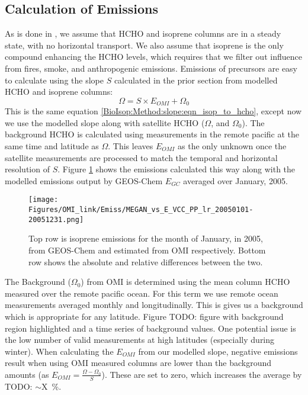     
    
    
  \subsection{Calculation of Emissions}
    \label{BioIsop:Method:calculation}
   
    As is done in \textcite{Palmer2003, Millet2006, Bauwens2016}, we assume that HCHO and isoprene columns are in a steady state, with no horizontal transport.
    We also assume that isoprene is the only compound enhancing the HCHO levels, which requires that we filter out influence from fires, smoke, and anthropogenic emissions.
    Emissions of precursors are easy to calculate using the slope $S$ calculated in the prior section from modelled HCHO and isoprene columns:
    \begin{equation*}
    \Omega = S \times E_{OMI} + \Omega_0
    \end{equation*}
    This is the same equation \ref{BioIsop:Method:slope:eqn_isop_to_hcho}, except now we use the modelled slope along with satellite HCHO ($\Omega$, and $\Omega_0$).
    The background HCHO is calculated using measurements in the remote pacific at the same time and latitude as $\Omega$.
    This leaves $E_{OMI}$ as the only unknown once the satellite measurements are processed to match the temporal and horizontal resolution of $S$.
    Figure \ref{BioIsop:Method:calculation:fig_E_isop_200501} shows the emissions calculated this way along with the modelled emissions output by GEOS-Chem $E_{GC}$ averaged over January, 2005.
    \begin{figure}
      \texttt{[image: Figures/OMI\_link/Emiss/MEGAN\_vs\_E\_VCC\_PP\_lr\_20050101-20051231.png]}
      \caption{%
        Top row is isoprene emissions for the month of January, in 2005, from GEOS-Chem and estimated from OMI respectively.
        Bottom row shows the absolute and relative differences between the two.
      }
      \label{BioIsop:Method:calculation:fig_E_isop_200501}
    \end{figure}
    
    The Background ($\Omega_0$) from OMI is determined using the mean column HCHO measured over the remote pacific ocean.
    For this term we use remote ocean measurements averaged monthly and longitudinally.
    This is gives us a background which is appropriate for any latitude.
    Figure TODO: figure with background region highlighted and a time series of background values.
    One potential issue is the low number of valid measurements at high latitudes (especially during winter).
    When calculating the $E_{OMI}$ from our modelled slope, negative emissions result when using OMI measured columns are lower than the background amounts (as $E_{OMI} = \frac{\Omega - \Omega_0}{S}$).
    These are set to zero, which increases the average by TODO: $\sim$X~\%.
    
